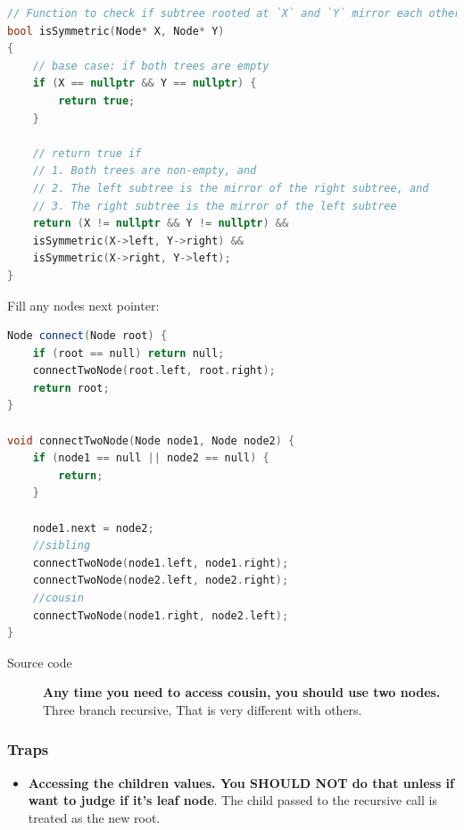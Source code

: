 \documentclass[a4paper,11pt,twoside]{book}
\begin{document}
\begin{lstlisting}[frame=single, language=c++]
// Function to check if subtree rooted at `X` and `Y` mirror each other
bool isSymmetric(Node* X, Node* Y)
{
	// base case: if both trees are empty
	if (X == nullptr && Y == nullptr) {
		return true;
	}
	
	// return true if
	// 1. Both trees are non-empty, and
	// 2. The left subtree is the mirror of the right subtree, and
	// 3. The right subtree is the mirror of the left subtree
	return (X != nullptr && Y != nullptr) &&
	isSymmetric(X->left, Y->right) &&
	isSymmetric(X->right, Y->left);
}
\end{lstlisting}


	\par Fill any nodes next pointer:
\begin{lstlisting}[frame=single, language=c++]
Node connect(Node root) {
	if (root == null) return null;
	connectTwoNode(root.left, root.right);
	return root;
}

void connectTwoNode(Node node1, Node node2) {
	if (node1 == null || node2 == null) {
		return;
	}

	node1.next = node2;
	//sibling	
	connectTwoNode(node1.left, node1.right);
	connectTwoNode(node2.left, node2.right);
	//cousin
	connectTwoNode(node1.right, node2.left);
}
\end{lstlisting}
\begin{description}
	\item[Source code] \textbf{Any time you need to access cousin, you should use two nodes.} Three branch recursive, That is very different with others. 
\end{description}




\subsubsection{Traps}
\begin{itemize}
	\par You can check if one node is leaf node. The basic idea is just like to find if a value exist in the tree. But you can't ignore base case.
	
\begin{lstlisting}
      1    //must have base case to deal with this tree
    /   \     
  null   2


      1    //if (root->left == null && root->right == null) return;
    /   \  //can deal with this context. but can't deal with previous tree.
 null   null
 
int countLeaves(Node* t){ //an example of isLeaf
	if(t == null) 
		return 0;
	
	if(isLeaf(t))  {
		return 1;
	}
	else
		return countLeaves(t.left) +countLeaves( t.right);
}		
\end{lstlisting}		
	
	\item \textbf{Accessing the children values. You SHOULD NOT do that unless if want to judge if it's leaf node}. The child passed to the recursive call is treated as the new root. 
	
\end{itemize}
\end{document}
